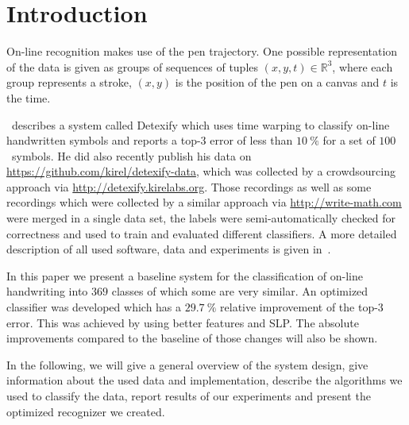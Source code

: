 
\section{Introduction}
On-line recognition makes use of the pen trajectory. One possible
representation of the data is given as groups of sequences of tuples $(x, y, t)
\in \mathbb{R}^3$, where each group represents a stroke, $(x, y)$ is the
position of the pen on a canvas and $t$ is the time.



\cite{Kirsch}~describes a system called Detexify which uses
time warping to classify on-line handwritten symbols and reports a top-3 error
of less than $\SI{10}{\percent}$ for a set of $\num{100}$~symbols. He did also
recently publish his data on \url{https://github.com/kirel/detexify-data},
which was collected by a crowdsourcing approach via
\url{http://detexify.kirelabs.org}. Those recordings as well as some recordings
which were collected by a similar approach via \url{http://write-math.com} were
merged in a single data set, the labels were semi-automatically checked for
correctness and used to train and evaluated different classifiers. A more
detailed description of all used software, data and experiments is given
in~\cite{Thoma:2014}.

In this paper we present a baseline system for the classification of on-line
handwriting into $369$ classes of which some are very similar. An optimized
classifier was developed which has a $\SI{29.7}{\percent}$ relative improvement
of the top-3 error. This was achieved by using better features and \gls{SLP}.
The absolute improvements compared to the baseline of those changes will also
be shown.

In the following, we will give a general overview of the system design, give
information about the used data and implementation, describe the algorithms
we used to classify the data, report results of our experiments and present
the optimized recognizer we created.